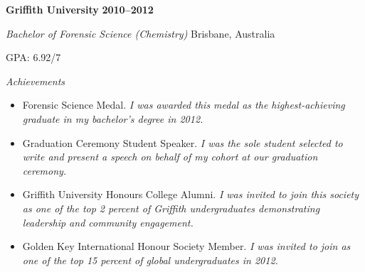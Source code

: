 \textbf{\large Griffith University} \hfill \textbf{2010--2012} \par
\vspace{1mm}
\textit{Bachelor of Forensic Science (Chemistry)} \hfill Brisbane, Australia \par
\vspace{1mm}
GPA: 6.92/7 \par
\textit{Achievements} \par
\begin{samepage}
\begin{itemize}
	\item Forensic Science Medal. \textit{I was awarded this medal as the highest-achieving graduate in my bachelor's degree in 2012.}
    \item Graduation Ceremony Student Speaker. \textit{I was the sole student selected to write and present a speech on behalf of my cohort at our graduation ceremony.}
    \item Griffith University Honours College Alumni. \textit{I was invited to join this society as one of the top 2 percent of Griffith undergraduates demonstrating leadership and community engagement.}
    \item Golden Key International Honour Society Member. \textit{I was invited to join as one of the top 15 percent of global undergraduates in 2012.}
\end{itemize}\par
\end{samepage}